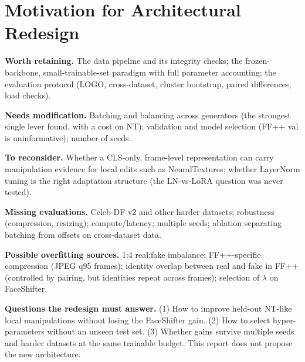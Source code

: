 \documentclass[10pt,a4paper]{article}
\begin{document}
\section{Motivation for Architectural Redesign}\label{sec:redesign}
\textbf{Worth retaining.} The data pipeline and its integrity checks; the frozen-backbone, small-trainable-set
paradigm with full parameter accounting; the evaluation protocol (LOGO, cross-dataset, cluster bootstrap,
paired differences, load checks).

\textbf{Needs modification.} Batching and balancing across generators (the strongest single lever found,
with a cost on NT); validation and model selection (FF++ val is uninformative); number of seeds.

\textbf{To reconsider.} Whether a CLS-only, frame-level representation can carry manipulation evidence
for local edits such as NeuralTextures; whether LayerNorm tuning is the right adaptation structure (the
LN-vs-LoRA question was never tested).

\textbf{Missing evaluations.} Celeb-DF v2 and other harder datasets; robustness (compression, resizing);
compute/latency; multiple seeds; ablation separating batching from offsets on cross-dataset data.

\textbf{Possible overfitting sources.} 1:4 real:fake imbalance; FF++-specific compression (JPEG q95
frames); identity overlap between real and fake in FF++ (controlled by pairing, but identities repeat
across frames); selection of \(\lambda\) on FaceShifter.

\textbf{Questions the redesign must answer.} (1) How to improve held-out NT-like local manipulations
without losing the FaceShifter gain. (2) How to select hyper-parameters without an unseen test set.
(3) Whether gains survive multiple seeds and harder datasets at the same trainable budget.
This report does not propose the new architecture.

\end{document}
